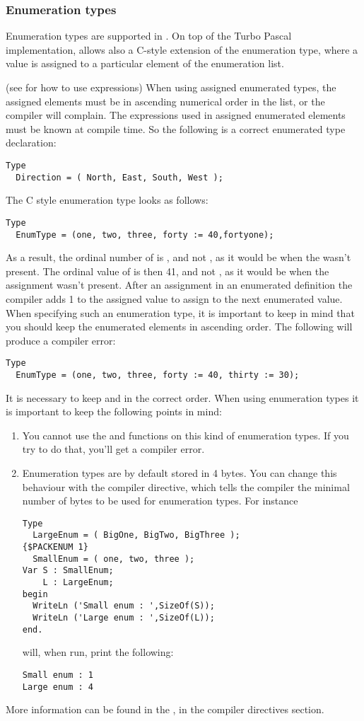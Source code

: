 \documentclass{report}
\begin{document}
\subsubsection{Enumeration types}
Enumeration types are supported in \fpc. On top of the Turbo Pascal
implementation, \fpc allows also a C-style extension of the
enumeration type, where a value is assigned to a particular element of
the enumeration list.

(see  for how to use expressions)
When using assigned enumerated types, the assigned elements must be in
ascending numerical order in the list, or the compiler will complain.
The expressions used in assigned enumerated elements must be known at
compile time.
So the following is a correct enumerated type declaration:
\begin{verbatim}
Type
  Direction = ( North, East, South, West );
\end{verbatim}
The C style enumeration type looks as follows:
\begin{verbatim}
Type
  EnumType = (one, two, three, forty := 40,fortyone);
\end{verbatim}
As a result, the ordinal number of  is , and not ,
as it would be when the  wasn't present.
The ordinal value of  is then {41}, and not , as it
would be when the assignment wasn't present. After an assignment in an
enumerated definition the compiler adds 1 to the assigned value to assign to
the next enumerated value.
When specifying such an enumeration type, it is important to keep in mind
that you should keep the enumerated elements in ascending order. The
following will produce a compiler error:
\begin{verbatim}
Type
  EnumType = (one, two, three, forty := 40, thirty := 30);
\end{verbatim}
It is necessary to keep  and  in the correct order.
When using enumeration types it is important to keep the following points
in mind:
\begin{enumerate}
\item You cannot use the  and  functions on
this kind of enumeration types. If you try to do that, you'll get a compiler
error.
\item Enumeration types are by default stored in 4 bytes. You can change
this behaviour with the  compiler directive, which
tells the compiler the minimal number of bytes to be used for enumeration
types.
For instance
\begin{verbatim}
Type
  LargeEnum = ( BigOne, BigTwo, BigThree );
{$PACKENUM 1}
  SmallEnum = ( one, two, three );
Var S : SmallEnum;
    L : LargeEnum;
begin
  WriteLn ('Small enum : ',SizeOf(S));
  WriteLn ('Large enum : ',SizeOf(L));
end.
\end{verbatim}
will, when run, print the following:
\begin{verbatim}
Small enum : 1
Large enum : 4
\end{verbatim}
\end{enumerate}
More information can be found in the \progref, in the compiler directives
section.
\end{document}
